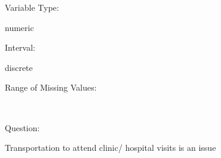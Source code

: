 \documentclass[
]{article}
\begin{document}
\begin{minipage}[t]{0.3\linewidth}

Variable Type:

\end{minipage}%
\begin{minipage}[t]{0.7\linewidth}

numeric

\end{minipage}

\begin{minipage}[t]{0.3\linewidth}

Interval:

\end{minipage}%
\begin{minipage}[t]{0.7\linewidth}

discrete

\end{minipage}

\begin{minipage}[t]{0.3\linewidth}

Range of Missing Values:

\end{minipage}%
\begin{minipage}[t]{0.7\linewidth}

~

\end{minipage}

\begin{minipage}[t]{0.3\linewidth}

Question:

\end{minipage}%
\begin{minipage}[t]{0.7\linewidth}

Transportation to attend clinic/ hospital visits is an issue

\end{minipage}
\end{document}

